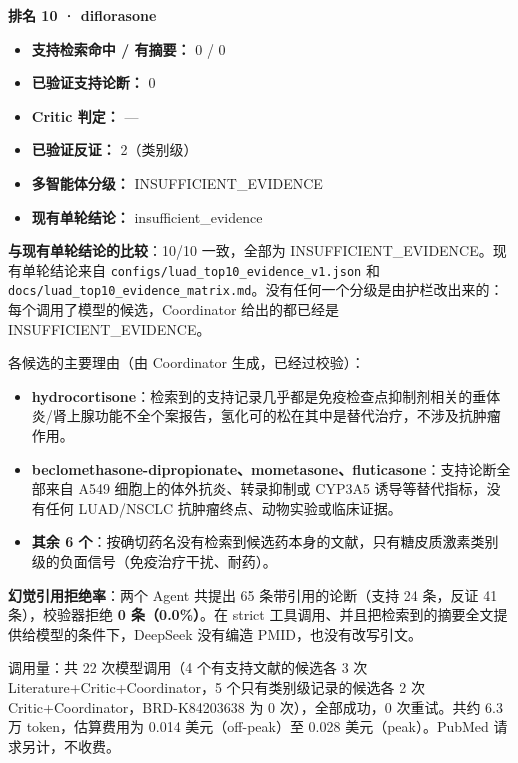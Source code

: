 \documentclass[
  10pt,
]{ctexart}
\providecommand{\tightlist}{%
  \setlength{\itemsep}{0pt}\setlength{\parskip}{0pt}}
\begin{document}
\textbf{排名 10 · diflorasone}

\begin{itemize}
\tightlist
\item
  \textbf{支持检索命中 / 有摘要：} 0 / 0
\item
  \textbf{已验证支持论断：} 0
\item
  \textbf{Critic 判定：} ---
\item
  \textbf{已验证反证：} 2（类别级）
\item
  \textbf{多智能体分级：} INSUFFICIENT\_EVIDENCE
\item
  \textbf{现有单轮结论：} insufficient\_evidence
\end{itemize}

\textbf{与现有单轮结论的比较}：10/10 一致，全部为
INSUFFICIENT\_EVIDENCE。现有单轮结论来自
\texttt{configs/\allowbreak{}luad\_\allowbreak{}top10\_\allowbreak{}evidence\_\allowbreak{}v1.\allowbreak{}json} 和
\texttt{docs/\allowbreak{}luad\_\allowbreak{}top10\_\allowbreak{}evidence\_\allowbreak{}matrix.\allowbreak{}md}。没有任何一个分级是由护栏改出来的：每个调用了模型的候选，Coordinator
给出的都已经是 INSUFFICIENT\_EVIDENCE。

各候选的主要理由（由 Coordinator 生成，已经过校验）：

\begin{itemize}
\tightlist
\item
  \textbf{hydrocortisone}：检索到的支持记录几乎都是免疫检查点抑制剂相关的垂体炎/肾上腺功能不全个案报告，氢化可的松在其中是替代治疗，不涉及抗肿瘤作用。
\item
  \textbf{beclomethasone-dipropionate、mometasone、fluticasone}：支持论断全部来自
  A549 细胞上的体外抗炎、转录抑制或 CYP3A5 诱导等替代指标，没有任何
  LUAD/NSCLC 抗肿瘤终点、动物实验或临床证据。
\item
  \textbf{其余 6
  个}：按确切药名没有检索到候选药本身的文献，只有糖皮质激素类别级的负面信号（免疫治疗干扰、耐药）。
\end{itemize}

\textbf{幻觉引用拒绝率}：两个 Agent 共提出 65 条带引用的论断（支持 24
条，反证 41 条），校验器拒绝 \textbf{0 条（0.0\%）}。在 strict
工具调用、并且把检索到的摘要全文提供给模型的条件下，DeepSeek 没有编造
PMID，也没有改写引文。

调用量：共 22 次模型调用（4 个有支持文献的候选各 3 次
Literature+Critic+Coordinator，5 个只有类别级记录的候选各 2 次
Critic+Coordinator，BRD-K84203638 为 0 次），全部成功，0 次重试。共约
6.3 万 token，估算费用为 0.014 美元（off-peak）至 0.028
美元（peak）。PubMed 请求另计，不收费。
\end{document}
